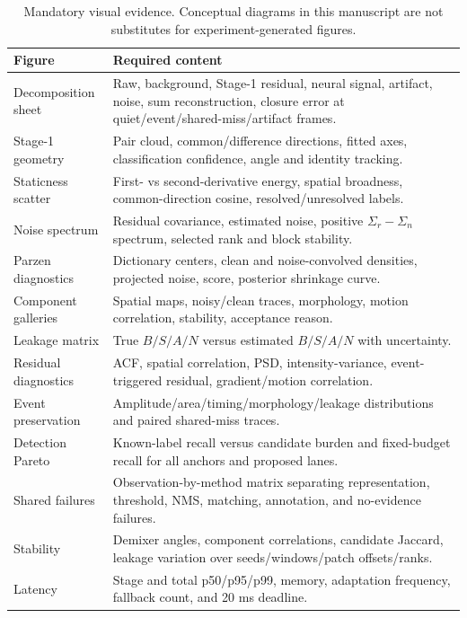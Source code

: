 \documentclass[11pt]{article}
\begin{document}
\begin{table}[H]
\centering
\small
\begin{tabularx}{\textwidth}{>{\raggedright\arraybackslash}p{}X}
\toprule
Figure & Required content \\
\midrule
Decomposition sheet & Raw, background, Stage-1 residual, neural signal, artifact,
noise, sum reconstruction, closure error at quiet/event/shared-miss/artifact frames. \\
Stage-1 geometry & Pair cloud, common/difference directions, fitted axes,
classification confidence, angle and identity tracking. \\
Staticness scatter & First- vs second-derivative energy, spatial broadness,
common-direction cosine, resolved/unresolved labels. \\
Noise spectrum & Residual covariance, estimated noise, positive
$\Sigma_r-\Sigma_n$ spectrum, selected rank and block stability. \\
Parzen diagnostics & Dictionary centers, clean and noise-convolved densities,
projected noise, score, posterior shrinkage curve. \\
Component galleries & Spatial maps, noisy/clean traces, morphology, motion
correlation, stability, acceptance reason. \\
Leakage matrix & True $B/S/A/N$ versus estimated $B/S/A/N$ with uncertainty. \\
Residual diagnostics & ACF, spatial correlation, PSD, intensity-variance,
event-triggered residual, gradient/motion correlation. \\
Event preservation & Amplitude/area/timing/morphology/leakage distributions and
paired shared-miss traces. \\
Detection Pareto & Known-label recall versus candidate burden and fixed-budget
recall for all anchors and proposed lanes. \\
Shared failures & Observation-by-method matrix separating representation,
threshold, NMS, matching, annotation, and no-evidence failures. \\
Stability & Demixer angles, component correlations, candidate Jaccard, leakage
variation over seeds/windows/patch offsets/ranks. \\
Latency & Stage and total p50/p95/p99, memory, adaptation frequency, fallback
count, and 20 ms deadline. \\
\bottomrule
\end{tabularx}
\caption{Mandatory visual evidence. Conceptual diagrams in this manuscript are
not substitutes for experiment-generated figures.}
\label{tab:figures}
\end{table}
\end{document}

